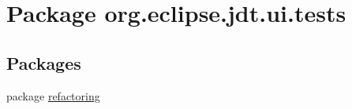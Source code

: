 \hypertarget{namespaceorg_1_1eclipse_1_1jdt_1_1ui_1_1tests}{
\section{Package org.eclipse.jdt.ui.tests}
\label{namespaceorg_1_1eclipse_1_1jdt_1_1ui_1_1tests}
}
\subsection*{Packages}
\begin{DoxyCompactItemize}
\item 
package \hyperlink{namespaceorg_1_1eclipse_1_1jdt_1_1ui_1_1tests_1_1refactoring}{refactoring}
\end{DoxyCompactItemize}
